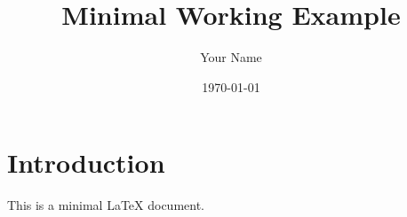 \documentclass{article}
\title{Minimal Working Example}
\author{Your Name} \date{\today}
\begin{document}
\maketitle

\section{Introduction}

This is a minimal LaTeX document.
\end{document}
